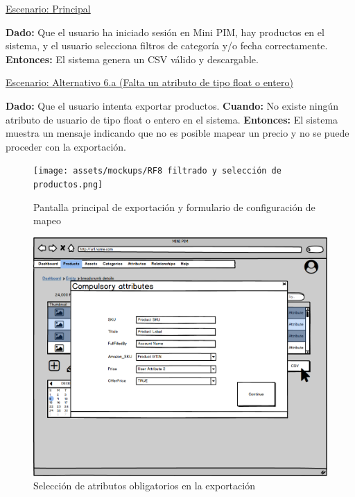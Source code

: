 
\underline{Escenario: Principal}\par
\textbf{Dado:} Que el usuario ha iniciado sesión en Mini PIM, hay productos en el sistema, y el usuario selecciona filtros de categoría y/o fecha correctamente.  
\textbf{Entonces:} El sistema genera un CSV válido y descargable.\par

\underline{Escenario: Alternativo 6.a (Falta un atributo de tipo float o entero)}\par
\textbf{Dado:} Que el usuario intenta exportar productos.  
\textbf{Cuando:} No existe ningún atributo de usuario de tipo float o entero en el sistema.  
\textbf{Entonces:} El sistema muestra un mensaje indicando que no es posible mapear un precio y no se puede proceder con la exportación.\par

\begin{figure}[H]
    \texttt{[image: assets/mockups/RF8 filtrado y selección de productos.png]}
    \caption{Pantalla principal de exportación y formulario de configuración de mapeo}
\end{figure}


\begin{figure}[H]
    \includegraphics[width=1\linewidth]{assets/mockups/RF8 Seleccion de atributos obligatorios.png}
    \caption{Selección de atributos obligatorios en la exportación}
\end{figure}

